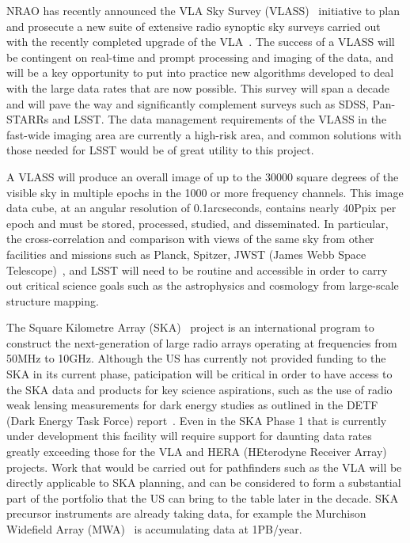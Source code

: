 NRAO has recently announced the VLA Sky Survey (VLASS)~\cite{vlass}
initiative to plan and prosecute a new suite of extensive radio
synoptic sky surveys carried out with the recently completed upgrade
of the VLA~\cite{evla}. The success of a VLASS will be contingent on
real-time and prompt processing and imaging of the data, and will be a
key opportunity to put into practice new algorithms developed to deal
with the large data rates that are now possible. This survey will span
a decade and will pave the way and significantly complement surveys
such as SDSS, Pan-STARRs and LSST. The data management requirements of
the VLASS in the fast-wide imaging area are currently a high-risk
area, and common solutions with those needed for LSST would be of
great utility to this project.

A VLASS will produce an overall image of up to the 30000 square
degrees of the visible sky in multiple epochs in the 1000 or more
frequency channels. This image data cube, at an angular resolution of
0.1arcseconds, contains nearly 40Ppix per epoch and must be stored,
processed, studied, and disseminated. In particular, the
cross-correlation and comparison with views of the same sky from other
facilities and missions such as Planck, Spitzer, JWST (James Webb
Space Telescope)~\cite{jwst}, and LSST will need to be routine and
accessible in order to carry out critical science goals such as the
astrophysics and cosmology from large-scale structure mapping.

The Square Kilometre Array (SKA)~\cite{ska} project is an
international program to construct the next-generation of large radio
arrays operating at frequencies from 50MHz to 10GHz. Although the US
has currently not provided funding to the SKA in its current phase,
paticipation will be critical in order to have access to the SKA data
and products for key science aspirations, such as the use of radio
weak lensing measurements for dark energy studies as outlined in the
DETF (Dark Energy Task Force) report~\cite{detf}. Even in the SKA
Phase 1 that is currently under development this facility will require
support for daunting data rates greatly exceeding those for the VLA
and HERA (HEterodyne Receiver Array)~\cite{hera} projects. Work that
would be carried out for pathfinders such as the VLA will be directly
applicable to SKA planning, and can be considered to form a
substantial part of the portfolio that the US can bring to the table
later in the decade. SKA precursor instruments are already taking
data, for example the Murchison Widefield Array (MWA)~\cite{mwa} is
accumulating data at 1PB/year.

